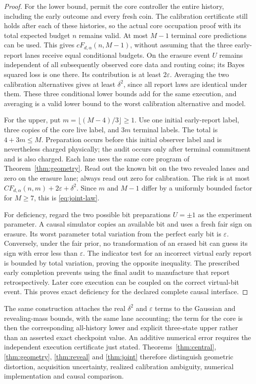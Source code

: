 \begin{proof}
For the lower bound, permit the core controller the entire history, including the early outcome and every fresh coin. The calibration certificate still holds after each of these histories, so the actual core occupation proof with its total expected budget $n$ remains valid. At most $M-1$ terminal core predictions can be used. This gives $cF_{d,\alpha}(n,M-1)$, without assuming that the three early-report lanes receive equal conditional budgets. On the erasure event $U$ remains independent of all subsequently observed core data and routing coins; its Bayes squared loss is one there. Its contribution is at least $2\varepsilon$. Averaging the two calibration alternatives gives at least $\delta^2$, since all report laws are identical under them. These three conditional lower bounds add for the same execution, and averaging is a valid lower bound to the worst calibration alternative and model.

For the upper, put $m=\lfloor(M-4)/3\rfloor\ge1$. Use one initial early-report label, three copies of the core live label, and $3m$ terminal labels. The total is $4+3m\le M$. Preparation occurs before this initial observer label and is nevertheless charged physically; the audit occurs only after terminal commitment and is also charged. Each lane uses the same core program of Theorem~\ref{thm:geometry}. Read out the known bit on the two revealed lanes and zero on the erasure lane; always read out zero for calibration. The risk is at most $CF_{d,\alpha}(n,m)+2\varepsilon+\delta^2$. Since $m$ and $M-1$ differ by a uniformly bounded factor for $M\ge7$, this is \eqref{eq:joint-law}.

For deficiency, regard the two possible bit preparations $U=\pm1$ as the experiment parameter. A causal simulator copies an available bit and uses a fresh fair sign on erasure. Its worst parameter total variation from the perfect early bit is $\varepsilon$. Conversely, under the fair prior, no transformation of an erased bit can guess its sign with error less than $\varepsilon$. The indicator test for an incorrect virtual early report is bounded by total variation, proving the opposite inequality. The prescribed early completion prevents using the final audit to manufacture that report retrospectively. Later core execution can be coupled on the correct virtual-bit event. This proves exact deficiency for the declared complete causal interface.
\end{proof}

The same construction attaches the real $\delta^2$ and $\varepsilon$ terms to the Gaussian and revealing-mass bounds, with the same lane accounting; the term for the core is then the corresponding all-history lower and explicit three-state upper rather than an asserted exact checkpoint value. An additive numerical error requires the independent execution certificate just stated. Theorems~\ref{thm:central}, \ref{thm:geometry}, \ref{thm:reveal} and \ref{thm:joint} therefore distinguish geometric distortion, acquisition uncertainty, realized calibration ambiguity, numerical implementation and causal comparison.
